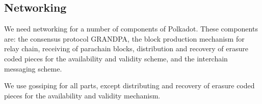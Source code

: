 \subsection{Networking}

We need networking for a number of components of Polkadot.
These components are: the consensus protocol GRANDPA,
the block production mechanism for relay chain, receiving of parachain blocks,
distribution and recovery of erasure coded pieces for the availability and validity scheme, and the
interchain messaging scheme.


We use gossiping for all parts, except distributing and recovery of erasure coded pieces for the availability and validity mechanism.
